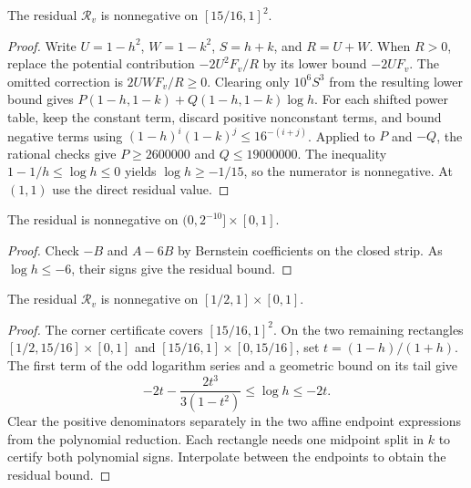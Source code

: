 \begin{lemma}
\label{cert:odd-b-corner}
\leanok
The residual $\mathcal R_v$ is nonnegative on $[15/16,1]^2$.
\end{lemma}

\begin{proof}
\leanok
Write $U=1-h^2$, $W=1-k^2$, $S=h+k$, and $R=U+W$.
When $R>0$, replace the potential contribution $-2U^2 F_v/R$ by its
lower bound $-2UF_v$. The omitted correction is $2UW F_v/R\ge0$.
Clearing only $10^6S^3$ from the resulting lower bound gives
$P(1-h,1-k)+Q(1-h,1-k)\log h$.
For each shifted power table, keep the constant term, discard positive
nonconstant terms, and bound negative terms using
$(1-h)^i(1-k)^j\le 16^{-(i+j)}$.
Applied to $P$ and $-Q$, the rational checks give
$P\ge 2600000$ and $Q\le 19000000$.
The inequality $1-1/h\le \log h\le0$ yields
$\log h\ge-1/15$, so the numerator is nonnegative.
At $(1,1)$ use the direct residual value.
\end{proof}

\begin{lemma}
\label{cert:odd-b-small}
\leanok
The residual is nonnegative on $(0,2^{-10}]\times[0,1]$.
\end{lemma}
\begin{proof}
\leanok
Check $-B$ and $A-6B$ by Bernstein coefficients on the closed strip.
As $\log h\le-6$, their signs give the residual bound.
\end{proof}

\begin{lemma}
\label{cert:odd-b-first-strip}
\leanok
The residual $\mathcal R_v$ is nonnegative on $[1/2,1]\times[0,1]$.
\end{lemma}

\begin{proof}
\leanok
The corner certificate covers $[15/16,1]^2$. On the two remaining rectangles
$[1/2,15/16]\times[0,1]$ and $[15/16,1]\times[0,15/16]$, set
$t=(1-h)/(1+h)$. The first term of the odd logarithm series and a geometric
bound on its tail give
\[
  -2t-\frac{2t^3}{3(1-t^2)}\le\log h\le -2t.
\]
Clear the positive denominators separately in the two affine endpoint
expressions from the polynomial reduction. Each rectangle needs one
midpoint split in $k$ to certify both polynomial signs. Interpolate between
the endpoints to obtain the residual bound.
\end{proof}

